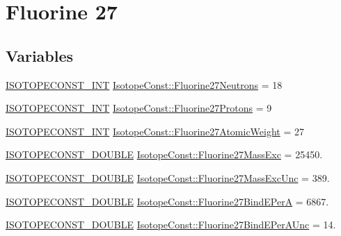 \hypertarget{group___isotope_const-_fluorine-_f27}{}\section{Fluorine 27}
\label{group___isotope_const-_fluorine-_f27}
\subsection*{Variables}
\begin{DoxyCompactItemize}
\item 
\mbox{\hyperlink{group___isotope_const-_macros_ga5f18360b3e99483a35c32d789e62621c}{I\+S\+O\+T\+O\+P\+E\+C\+O\+N\+S\+T\+\_\+\+I\+NT}} \mbox{\hyperlink{group___isotope_const-_fluorine-_f27_ga48102be2a15de0bb5d4a53ef71f50b35}{Isotope\+Const\+::\+Fluorine27\+Neutrons}} = 18
\item 
\mbox{\hyperlink{group___isotope_const-_macros_ga5f18360b3e99483a35c32d789e62621c}{I\+S\+O\+T\+O\+P\+E\+C\+O\+N\+S\+T\+\_\+\+I\+NT}} \mbox{\hyperlink{group___isotope_const-_fluorine-_f27_ga87d3ab92cf3b5286baa13b09670a1849}{Isotope\+Const\+::\+Fluorine27\+Protons}} = 9
\item 
\mbox{\hyperlink{group___isotope_const-_macros_ga5f18360b3e99483a35c32d789e62621c}{I\+S\+O\+T\+O\+P\+E\+C\+O\+N\+S\+T\+\_\+\+I\+NT}} \mbox{\hyperlink{group___isotope_const-_fluorine-_f27_ga187bf53bf3e043dcfc847fae285d4d22}{Isotope\+Const\+::\+Fluorine27\+Atomic\+Weight}} = 27
\item 
\mbox{\hyperlink{group___isotope_const-_macros_ga8f45a7272ce02c0b4c65c44636ed719a}{I\+S\+O\+T\+O\+P\+E\+C\+O\+N\+S\+T\+\_\+\+D\+O\+U\+B\+LE}} \mbox{\hyperlink{group___isotope_const-_fluorine-_f27_ga15699622341f37a3f5e33aacf74b177b}{Isotope\+Const\+::\+Fluorine27\+Mass\+Exc}} = 25450.
\item 
\mbox{\hyperlink{group___isotope_const-_macros_ga8f45a7272ce02c0b4c65c44636ed719a}{I\+S\+O\+T\+O\+P\+E\+C\+O\+N\+S\+T\+\_\+\+D\+O\+U\+B\+LE}} \mbox{\hyperlink{group___isotope_const-_fluorine-_f27_gae44905084a7a6621633d0374041f198a}{Isotope\+Const\+::\+Fluorine27\+Mass\+Exc\+Unc}} = 389.
\item 
\mbox{\hyperlink{group___isotope_const-_macros_ga8f45a7272ce02c0b4c65c44636ed719a}{I\+S\+O\+T\+O\+P\+E\+C\+O\+N\+S\+T\+\_\+\+D\+O\+U\+B\+LE}} \mbox{\hyperlink{group___isotope_const-_fluorine-_f27_ga563c40f3b9cd9df95759715b6acf1a6e}{Isotope\+Const\+::\+Fluorine27\+Bind\+E\+PerA}} = 6867.
\item 
\mbox{\hyperlink{group___isotope_const-_macros_ga8f45a7272ce02c0b4c65c44636ed719a}{I\+S\+O\+T\+O\+P\+E\+C\+O\+N\+S\+T\+\_\+\+D\+O\+U\+B\+LE}} \mbox{\hyperlink{group___isotope_const-_fluorine-_f27_gaf4f17d4725138f7acff3a97abe83b34f}{Isotope\+Const\+::\+Fluorine27\+Bind\+E\+Per\+A\+Unc}} = 14.

\end{DoxyCompactItemize}
